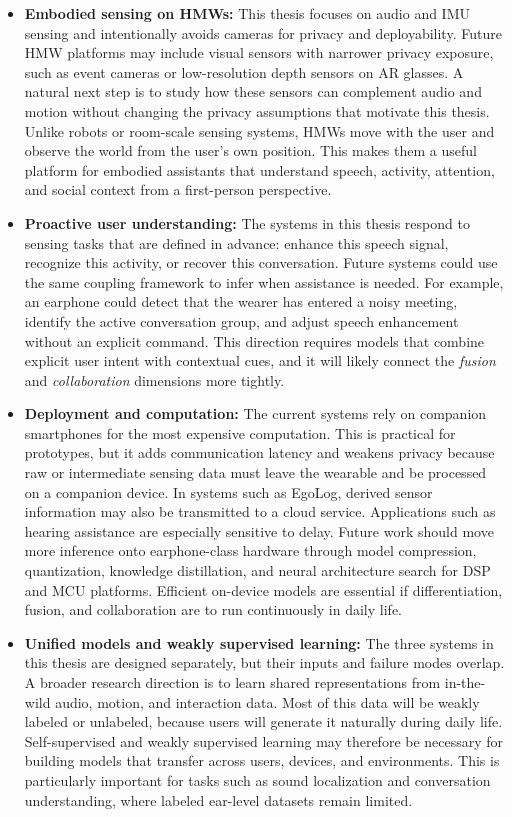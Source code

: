 \documentclass[11pt]{gsasthesis} %
\begin{document}
\begin{itemize}
  \item \textbf{Embodied sensing on HMWs:}
  This thesis focuses on audio and IMU sensing and intentionally avoids cameras for privacy and deployability. Future HMW platforms may include visual sensors with narrower privacy exposure, such as event cameras or low-resolution depth sensors on AR glasses. A natural next step is to study how these sensors can complement audio and motion without changing the privacy assumptions that motivate this thesis. Unlike robots or room-scale sensing systems, HMWs move with the user and observe the world from the user's own position. This makes them a useful platform for embodied assistants that understand speech, activity, attention, and social context from a first-person perspective.

  \item \textbf{Proactive user understanding:}
  The systems in this thesis respond to sensing tasks that are defined in advance: enhance this speech signal, recognize this activity, or recover this conversation. Future systems could use the same coupling framework to infer when assistance is needed. For example, an earphone could detect that the wearer has entered a noisy meeting, identify the active conversation group, and adjust speech enhancement without an explicit command. This direction requires models that combine explicit user intent with contextual cues, and it will likely connect the \textit{fusion} and \textit{collaboration} dimensions more tightly.

  \item \textbf{Deployment and computation:}
  The current systems rely on companion smartphones for the most expensive computation. This is practical for prototypes, but it adds communication latency and weakens privacy because raw or intermediate sensing data must leave the wearable and be processed on a companion device. In systems such as EgoLog, derived sensor information may also be transmitted to a cloud service. Applications such as hearing assistance are especially sensitive to delay. Future work should move more inference onto earphone-class hardware through model compression, quantization, knowledge distillation, and neural architecture search for DSP and MCU platforms. Efficient on-device models are essential if differentiation, fusion, and collaboration are to run continuously in daily life.

  \item \textbf{Unified models and weakly supervised learning:}
  The three systems in this thesis are designed separately, but their inputs and failure modes overlap. A broader research direction is to learn shared representations from in-the-wild audio, motion, and interaction data. Most of this data will be weakly labeled or unlabeled, because users will generate it naturally during daily life. Self-supervised and weakly supervised learning may therefore be necessary for building models that transfer across users, devices, and environments. This is particularly important for tasks such as sound localization and conversation understanding, where labeled ear-level datasets remain limited.


\end{itemize}
\end{document}
